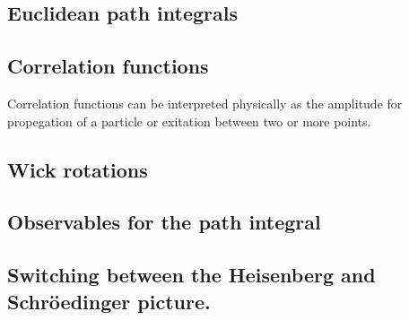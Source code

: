 \subsection{Euclidean path integrals}

\subsection{Correlation functions}
Correlation functions can be interpreted physically as the amplitude for propegation of a particle or exitation between two or more points.

\subsection{Wick rotations} %

\subsection{Observables for the path integral}

\subsection{Switching between the Heisenberg and Schröedinger picture.}





